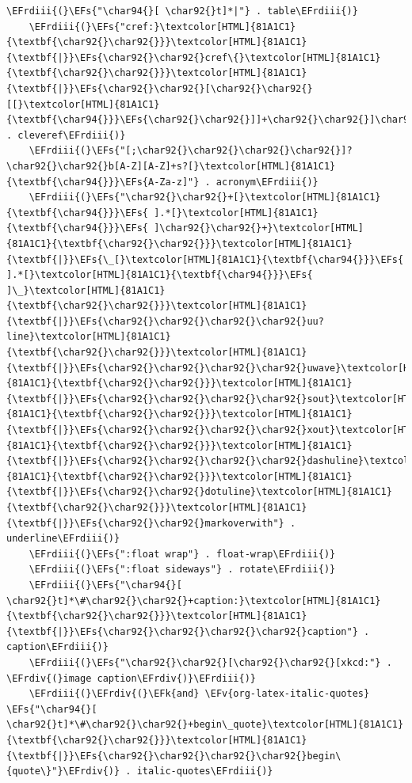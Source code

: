 \documentclass{scrartcl}
\newcommand{\EFk}[1]{\textcolor{EFk}{#1}} %
\newcommand{\EFs}[1]{\textcolor{EFs}{#1}} %
\newcommand{\EFv}[1]{\textcolor{EFv}{#1}} %
\newcommand{\EFrdiii}[1]{#1} %
\newcommand{\EFrdiv}[1]{#1} %
\begin{document}
\begin{Code}
\begin{Verbatim}[]
    \EFrdiii{(}\EFs{"\char94{}[ \char92{}t]*|"} . table\EFrdiii{)}
    \EFrdiii{(}\EFs{"cref:}\textcolor[HTML]{81A1C1}{\textbf{\char92{}\char92{}}}\textcolor[HTML]{81A1C1}{\textbf{|}}\EFs{\char92{}\char92{}cref\{}\textcolor[HTML]{81A1C1}{\textbf{\char92{}\char92{}}}\textcolor[HTML]{81A1C1}{\textbf{|}}\EFs{\char92{}\char92{}[\char92{}\char92{}[[}\textcolor[HTML]{81A1C1}{\textbf{\char94{}}}\EFs{\char92{}\char92{}]]+\char92{}\char92{}]\char92{}\char92{}]"} . cleveref\EFrdiii{)}
    \EFrdiii{(}\EFs{"[;\char92{}\char92{}\char92{}\char92{}]?\char92{}\char92{}b[A-Z][A-Z]+s?[}\textcolor[HTML]{81A1C1}{\textbf{\char94{}}}\EFs{A-Za-z]"} . acronym\EFrdiii{)}
    \EFrdiii{(}\EFs{"\char92{}\char92{}+[}\textcolor[HTML]{81A1C1}{\textbf{\char94{}}}\EFs{ ].*[}\textcolor[HTML]{81A1C1}{\textbf{\char94{}}}\EFs{ ]\char92{}\char92{}+}\textcolor[HTML]{81A1C1}{\textbf{\char92{}\char92{}}}\textcolor[HTML]{81A1C1}{\textbf{|}}\EFs{\_[}\textcolor[HTML]{81A1C1}{\textbf{\char94{}}}\EFs{ ].*[}\textcolor[HTML]{81A1C1}{\textbf{\char94{}}}\EFs{ ]\_}\textcolor[HTML]{81A1C1}{\textbf{\char92{}\char92{}}}\textcolor[HTML]{81A1C1}{\textbf{|}}\EFs{\char92{}\char92{}\char92{}\char92{}uu?line}\textcolor[HTML]{81A1C1}{\textbf{\char92{}\char92{}}}\textcolor[HTML]{81A1C1}{\textbf{|}}\EFs{\char92{}\char92{}\char92{}\char92{}uwave}\textcolor[HTML]{81A1C1}{\textbf{\char92{}\char92{}}}\textcolor[HTML]{81A1C1}{\textbf{|}}\EFs{\char92{}\char92{}\char92{}\char92{}sout}\textcolor[HTML]{81A1C1}{\textbf{\char92{}\char92{}}}\textcolor[HTML]{81A1C1}{\textbf{|}}\EFs{\char92{}\char92{}\char92{}\char92{}xout}\textcolor[HTML]{81A1C1}{\textbf{\char92{}\char92{}}}\textcolor[HTML]{81A1C1}{\textbf{|}}\EFs{\char92{}\char92{}\char92{}\char92{}dashuline}\textcolor[HTML]{81A1C1}{\textbf{\char92{}\char92{}}}\textcolor[HTML]{81A1C1}{\textbf{|}}\EFs{\char92{}\char92{}dotuline}\textcolor[HTML]{81A1C1}{\textbf{\char92{}\char92{}}}\textcolor[HTML]{81A1C1}{\textbf{|}}\EFs{\char92{}\char92{}markoverwith"} . underline\EFrdiii{)}
    \EFrdiii{(}\EFs{":float wrap"} . float-wrap\EFrdiii{)}
    \EFrdiii{(}\EFs{":float sideways"} . rotate\EFrdiii{)}
    \EFrdiii{(}\EFs{"\char94{}[ \char92{}t]*\#\char92{}\char92{}+caption:}\textcolor[HTML]{81A1C1}{\textbf{\char92{}\char92{}}}\textcolor[HTML]{81A1C1}{\textbf{|}}\EFs{\char92{}\char92{}\char92{}\char92{}caption"} . caption\EFrdiii{)}
    \EFrdiii{(}\EFs{"\char92{}\char92{}[\char92{}\char92{}[xkcd:"} . \EFrdiv{(}image caption\EFrdiv{)}\EFrdiii{)}
    \EFrdiii{(}\EFrdiv{(}\EFk{and} \EFv{org-latex-italic-quotes} \EFs{"\char94{}[ \char92{}t]*\#\char92{}\char92{}+begin\_quote}\textcolor[HTML]{81A1C1}{\textbf{\char92{}\char92{}}}\textcolor[HTML]{81A1C1}{\textbf{|}}\EFs{\char92{}\char92{}\char92{}\char92{}begin\{quote\}"}\EFrdiv{)} . italic-quotes\EFrdiii{)}

\end{Verbatim}
\end{Code}
\end{document}
